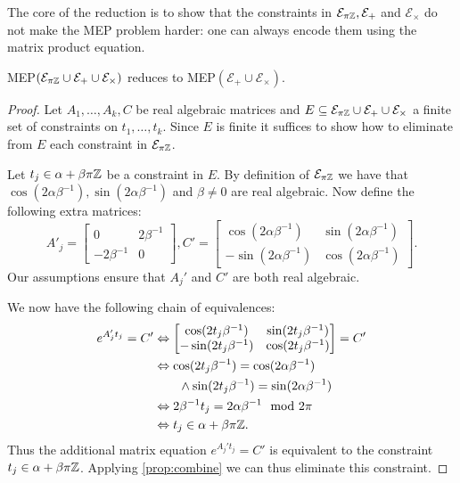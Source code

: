 The core of the reduction is to show that the constraints in
$\mathcal{E}_{\pi\mathbb{Z}},\mathcal{E}_{+}$ and
$\mathcal{E}_{\times}$ do not make the MEP problem harder: one can
always encode them using the matrix product equation.

\begin{proposition}
  MEP$(\mathcal{E}_{\pi\mathbb{Z}} \cup \mathcal{E}_{+} \cup
  \mathcal{E}_{\times})$ reduces to MEP$(\mathcal{E}_{+} \cup
  \mathcal{E}_{\times})$.
\label{lem:pi}
\end{proposition}
\begin{proof}
  Let $A_1,\ldots,A_k,C$ be real algebraic matrices and
  $E\subseteq \mathcal{E}_{\pi\mathbb{Z}} \cup \mathcal{E}_{+} \cup
  \mathcal{E}_{\times}$
  a finite set of constraints on $t_1,\ldots,t_k$.  Since $E$ is
  finite it suffices to show how to eliminate from $E$ each constraint
  in $\mathcal{E}_{\pi \mathbb{Z}}$.

  Let $t_j\in\alpha+\beta\pi\mathbb{Z}$ be a constraint in $E$.  By definition
of  $\mathcal{E}_{\pi\mathbb{Z}}$
we have
  that $\cos(2\alpha\beta^{-1}),\sin(2\alpha\beta^{-1})$ and
  $\beta\neq0$ are real algebraic.  Now define the following extra
  matrices:
\[A'_j=\begin{bmatrix}0&2\beta^{-1}\\-2\beta^{-1}&0\end{bmatrix},
 C'=\begin{bmatrix}\cos(2\alpha\beta^{-1})&
\sin(2\alpha\beta^{-1})\\-\sin(2\alpha\beta^{-1})&\cos(2\alpha\beta^{-1})\end{bmatrix}.\]
Our assumptions ensure that $A_j'$ and $C'$ are both real algebraic.

We now have the following chain of equivalences:
\begin{align*}
e^{A'_j t_j}=C'
&\Leftrightarrow\begin{bmatrix}\cos(2t_j\beta^{-1})&
\sin(2t_j\beta^{-1})\\-\sin(2t_j\beta^{-1})&\cos(2t_j\beta^{-1})\end{bmatrix}
=C'\\
&\Leftrightarrow\cos(2t_j\beta^{-1})=\cos(2\alpha\beta^{-1})\\
&\qquad\wedge\sin(2t_j\beta^{-1})=\sin(2\alpha\beta^{-1})\\
&\Leftrightarrow2\beta^{-1}t_j=2\alpha\beta^{-1}\mod 2\pi\\
&\Leftrightarrow t_j\in\alpha+\beta\pi\mathbb{Z}.
\end{align*}
Thus the additional matrix equation $e^{A_j't_j}=C'$ is equivalent to
the constraint $t_j\in\alpha+\beta\pi\mathbb{Z}$.  Applying
\cref{prop:combine} we can thus eliminate this constraint.
\end{proof}

